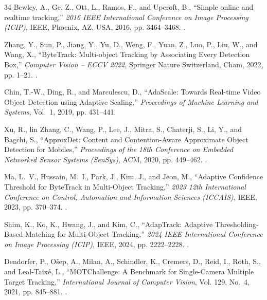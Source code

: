 \documentclass[journal]{new-aiaa}
\begin{document}
\begin{thebibliography}{34}
Bewley, A., Ge, Z., Ott, L., Ramos, F., and Upcroft, B., \enquote{{Simple
  online and realtime tracking},} \emph{2016 IEEE International Conference on
  Image Processing (ICIP)}, IEEE, Phoenix, AZ, USA, 2016, pp. 3464--3468.
\newblock {}.

Zhang, Y., Sun, P., Jiang, Y., Yu, D., Weng, F., Yuan, Z., Luo, P., Liu, W.,
  and Wang, X., \enquote{{ByteTrack: Multi-object Tracking by Associating Every
  Detection Box},} \emph{Computer Vision -- ECCV 2022}, Springer Nature
  Switzerland, Cham, 2022, pp. 1--21.
\newblock {}.

Chin, T.-W., Ding, R., and Marculescu, D., \enquote{{AdaScale: Towards
  Real-time Video Object Detection using Adaptive Scaling},} \emph{Proceedings
  of Machine Learning and Systems}, Vol.~1, 2019, pp. 431--441.

Xu, R., lin Zhang, C., Wang, P., Lee, J., Mitra, S., Chaterji, S., Li, Y., and
  Bagchi, S., \enquote{{ApproxDet: Content and Contention-Aware Approximate
  Object Detection for Mobiles},} \emph{Proceedings of the 18th Conference on
  Embedded Networked Sensor Systems (SenSys)}, ACM, 2020, pp. 449--462.
\newblock {}.

Ma, L.~V., Hussain, M.~I., Park, J., Kim, J., and Jeon, M., \enquote{{Adaptive
  Confidence Threshold for ByteTrack in Multi-Object Tracking},} \emph{2023
  12th International Conference on Control, Automation and Information Sciences
  (ICCAIS)}, IEEE, 2023, pp. 370--374.
\newblock {}.

Shim, K., Ko, K., Hwang, J., and Kim, C., \enquote{{AdapTrack: Adaptive
  Thresholding-Based Matching for Multi-Object Tracking},} \emph{2024 IEEE
  International Conference on Image Processing (ICIP)}, IEEE, 2024, pp.
  2222--2228.
\newblock {}.

Dendorfer, P., O{\v{s}}ep, A., Milan, A., Schindler, K., Cremers, D., Reid, I.,
  Roth, S., and Leal-Taix{\'e}, L., \enquote{{MOTChallenge: A Benchmark for
  Single-Camera Multiple Target Tracking},} \emph{International Journal of
  Computer Vision}, Vol. 129, No.~4, 2021, pp. 845--881.
\newblock {}.


\end{thebibliography}
\end{document}
